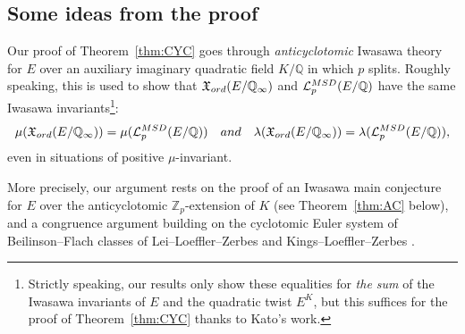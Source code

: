 \documentclass[a4paper,10pt]{amsart}
\numberwithin{equation}{section}
\numberwithin{equation}{section}
\theoremstyle{plain}
\theoremstyle{definition}
\theoremstyle{definition}
\theoremstyle{plain}
\theoremstyle{plain}
\theoremstyle{plain}
\theoremstyle{plain}
\newcommand{\Z}{\mathbb{Z}}
\newcommand{\Q}{\mathbb{Q}}
\newcommand{\Lcal}{\mathcal{L}}
\begin{document}
\subsection{Some ideas from the proof} 

Our proof of Theorem~\ref{thm:CYC} goes through  \emph{anticyclotomic} Iwasawa theory for $E$ over an auxiliary imaginary quadratic field $K/\Q$ in which $p$ splits. Roughly speaking, this is used to show that $\mathfrak{X}_{\rm ord}(E/\Q_\infty)$ and $\Lcal_p^{\rm MSD}(E/\Q)$ have the same Iwasawa invariants\footnote{Strictly speaking, our results only show these equalities for \emph{the sum} of the Iwasawa invariants of $E$ and the quadratic twist $E^K$, but this suffices for the proof of Theorem~\ref{thm:CYC} thanks to Kato's work.}: 
\[
\mu(\mathfrak{X}_{\rm ord}(E/\Q_\infty))=\mu(\Lcal_p^{\rm MSD}(E/\Q))
\quad\textrm{and}\quad
\lambda(\mathfrak{X}_{\rm ord}(E/\Q_\infty))=\lambda(\Lcal_p^{\rm MSD}(E/\Q)),
\]
even in situations of positive $\mu$-invariant. 



More precisely, our argument rests on the proof of an Iwasawa main conjecture for $E$ over the anticyclotomic $\Z_p$-extension of $K$ (see Theorem~\ref{thm:AC} below), and a congruence argument building on the cyclotomic Euler system of Beilinson--Flach classes of Lei--Loeffler--Zerbes \cite{RSCMF} and Kings--Loeffler--Zerbes \cite{explicit}. 


 
%
\end{document}
